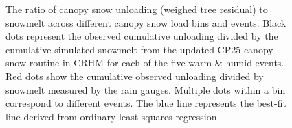 \documentclass[
  letterpaper,
]{tex/uofsthesis-cs}
\begin{document}
\begin{figure}


\caption{\label{fig-unld-melt-ratio}The ratio of canopy snow unloading
(weighed tree residual) to snowmelt across different canopy snow load
bins and events. Black dots represent the observed cumulative unloading
divided by the cumulative simulated snowmelt from the updated CP25
canopy snow routine in CRHM for each of the five warm \& humid events.
Red dots show the cumulative observed unloading divided by snowmelt
measured by the rain gauges. Multiple dots within a bin correspond to
different events. The blue line represents the best-fit line derived
from ordinary least squares regression.}

\end{figure}%
\end{document}
